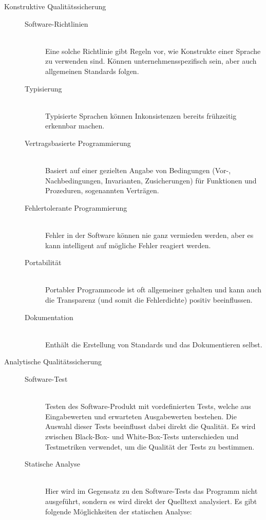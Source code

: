 \begin{description}
  \item[Konstruktive Qualitätssicherung] \hfill
  \begin{description}
    \item[Software-Richtlinien] \hfill \\ Eine solche Richtlinie gibt Regeln vor, wie Konstrukte einer Sprache zu verwenden sind. Können unternehmensspezifisch sein, aber auch allgemeinen Standards folgen.
    \item[Typisierung] \hfill \\ Typisierte Sprachen können Inkonsistenzen bereits frühzeitig erkennbar machen.
    \item[Vertragsbasierte Programmierung] \hfill \\ Basiert auf einer gezielten Angabe von Bedingungen (Vor-, Nachbedingungen, Invarianten, Zusicherungen) für Funktionen und Prozeduren, sogenannten Verträgen.
    \item[Fehlertolerante Programmierung] \hfill \\ Fehler in der Software können nie ganz vermieden werden, aber es kann intelligent auf mögliche Fehler reagiert werden.
    \item[Portabilität] \hfill \\ Portabler Programmcode ist oft allgemeiner gehalten und kann auch die Transparenz (und somit die Fehlerdichte) positiv beeinflussen.
    \item[Dokumentation] \hfill \\ Enthält die Erstellung von Standards und das Dokumentieren selbst.
  \end{description}
  \item[Analytische Qualitätssicherung] \hfill
  \begin{description}
    \item[Software-Test] \hfill \\ Testen des Software-Produkt mit vordefinierten Tests, welche aus Eingabewerten und erwarteten Ausgabewerten bestehen. Die Auswahl dieser Tests beeinflusst dabei direkt die Qualität. Es wird zwischen Black-Box- und White-Box-Tests unterschieden und Testmetriken verwendet, um die Qualität der Tests zu bestimmen.
    \item[Statische Analyse] \hfill \\ Hier wird im Gegensatz zu den Software-Tests das Programm nicht ausgeführt, sondern es wird direkt der Quelltext analysiert. Es gibt folgende Möglichkeiten der statischen Analyse:
    \begin{description}

\end{description}
\end{description}
\end{description}
